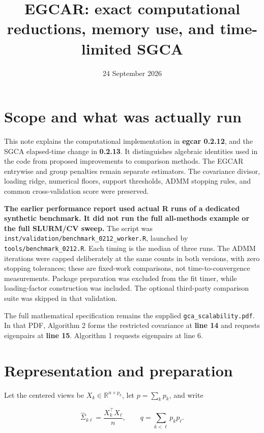 \documentclass[
  11pt,
]{article}
\title{EGCAR: exact computational reductions, memory use, and
time-limited SGCA}
\author{}
\date{24 September 2026}
\begin{document}
\maketitle

\hypertarget{scope-and-what-was-actually-run}{%
\section{Scope and what was actually
run}\label{scope-and-what-was-actually-run}}

This note explains the computational implementation in \textbf{egcar
0.2.12}, and the SGCA elapsed-time change in \textbf{0.2.13}. It
distinguishes algebraic identities used in the code from proposed
improvements to comparison methods. The EGCAR entrywise and group
penalties remain separate estimators. The covariance divisor, loading
ridge, numerical floors, support thresholds, ADMM stopping rules, and
common cross-validation score were preserved.

\textbf{The earlier performance report used actual R runs of a dedicated
synthetic benchmark. It did not run the full all-methods example or the
full SLURM/CV sweep.} The script was
\texttt{inst/validation/benchmark\_0212\_worker.R}, launched by
\texttt{tools/benchmark\_0212.R}. Each timing is the median of three
runs. The ADMM iterations were capped deliberately at the same counts in
both versions, with zero stopping tolerances; these are fixed-work
comparisons, not time-to-convergence measurements. Package preparation
was excluded from the fit timer, while loading-factor construction was
included. The optional third-party comparison suite was skipped in that
validation.

The full mathematical specification remains the supplied
\texttt{gca\_scalability.pdf}. In that PDF, Algorithm 2 forms the
restricted covariance at \textbf{line 14} and requests eigenpairs at
\textbf{line 15}. Algorithm 1 requests eigenpairs at line 6.

\hypertarget{representation-and-preparation}{%
\section{Representation and
preparation}\label{representation-and-preparation}}

Let the centered views be \(X_k\in\mathbb R^{n\times p_k}\), let
\(p=\sum_kp_k\), and write

\[
\widehat\Sigma_{k\ell}=\frac{X_k^\top X_\ell}{n},\qquad
q=\sum_{k<\ell}p_kp_\ell.
\]
\end{document}
